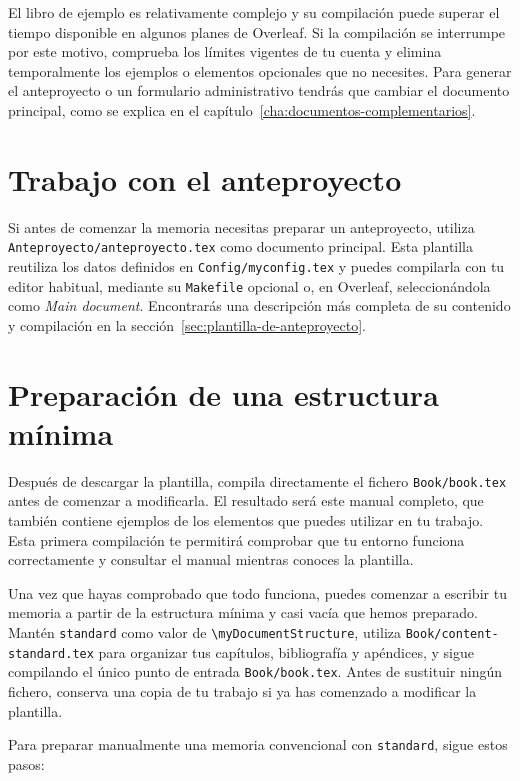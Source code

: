 El libro de ejemplo es relativamente complejo y su compilación puede superar el tiempo disponible en algunos planes de Overleaf. Si la compilación se interrumpe por este motivo, comprueba los límites vigentes de tu cuenta y elimina temporalmente los ejemplos o elementos opcionales que no necesites. Para generar el anteproyecto o un formulario administrativo tendrás que cambiar el documento principal, como se explica en el capítulo~\ref{cha:documentos-complementarios}.


\section{Trabajo con el anteproyecto}
\label{sec:primeros-pasos-anteproyecto}

Si antes de comenzar la memoria necesitas preparar un anteproyecto, utiliza \texttt{Anteproyecto/anteproyecto.tex} como documento principal. Esta plantilla reutiliza los datos definidos en \texttt{Config/myconfig.tex} y puedes compilarla con tu editor habitual, mediante su \texttt{Makefile} opcional o, en Overleaf, seleccionándola como \textit{Main document}. Encontrarás una descripción más completa de su contenido y compilación en la sección~\ref{sec:plantilla-de-anteproyecto}.

\section{Preparación de una estructura mínima}
\label{sec:estructura-minima}

Después de descargar la plantilla, compila directamente el fichero \texttt{Book/book.tex} antes de comenzar a modificarla. El resultado será este manual completo, que también contiene ejemplos de los elementos que puedes utilizar en tu trabajo. Esta primera compilación te permitirá comprobar que tu entorno funciona correctamente y consultar el manual mientras conoces la plantilla.

Una vez que hayas comprobado que todo funciona, puedes comenzar a escribir tu memoria a partir de la estructura mínima y casi vacía que hemos preparado. Mantén \texttt{standard} como valor de \texttt{\textbackslash{}myDocumentStructure}, utiliza \texttt{Book/content-standard.tex} para organizar tus capítulos, bibliografía y apéndices, y sigue compilando el único punto de entrada \texttt{Book/book.tex}. Antes de sustituir ningún fichero, conserva una copia de tu trabajo si ya has comenzado a modificar la plantilla.

Para preparar manualmente una memoria convencional con \texttt{standard}, sigue estos pasos:

